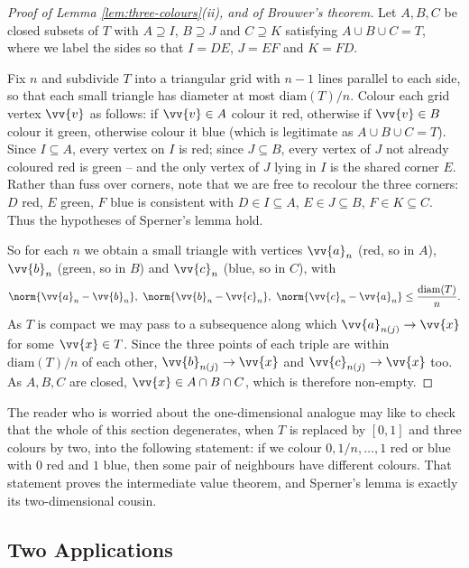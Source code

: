\begin{proof}[Proof of Lemma \ref{lem:three-colours}(ii), and of Brouwer's theorem]
	Let $A,B,C$ be closed subsets of $T$ with $A \supseteq I$, $B \supseteq J$ and $C \supseteq K$ satisfying $A \cup B \cup C = T$, where we label the sides so that $I = DE$, $J = EF$ and $K = FD$.

	Fix $n$ and subdivide $T$ into a triangular grid with $n-1$ lines parallel to each side, so that each small triangle has diameter at most $\mathrm{diam}(T)/n$. Colour each grid vertex $\vv{v}$ as follows: if $\vv{v} \in A$ colour it red, otherwise if $\vv{v}\in B$ colour it green, otherwise colour it blue (which is legitimate as $A\cup B\cup C = T$). Since $I \subseteq A$, every vertex on $I$ is red; since $J \subseteq B$, every vertex of $J$ not already coloured red is green -- and the only vertex of $J$ lying in $I$ is the shared corner $E$. Rather than fuss over corners, note that we are free to recolour the three corners: $D$ red, $E$ green, $F$ blue is consistent with $D \in I \subseteq A$, $E \in J \subseteq B$, $F \in K \subseteq C$. Thus the hypotheses of Sperner's lemma hold.

	So for each $n$ we obtain a small triangle with vertices $\vv{a}_n$ (red, so in $A$), $\vv{b}_n$ (green, so in $B$) and $\vv{c}_n$ (blue, so in $C$), with
	$$\norm{\vv{a}_n - \vv{b}_n},\ \norm{\vv{b}_n-\vv{c}_n},\ \norm{\vv{c}_n-\vv{a}_n} \leq \frac{\mathrm{diam}(T)}{n}.$$
	As $T$ is compact we may pass to a subsequence along which $\vv{a}_{n(j)} \to \vv{x}$ for some $\vv{x}\in T$. Since the three points of each triple are within $\mathrm{diam}(T)/n$ of each other, $\vv{b}_{n(j)} \to \vv{x}$ and $\vv{c}_{n(j)}\to\vv{x}$ too. As $A, B, C$ are closed, $\vv{x} \in A\cap B\cap C$, which is therefore non-empty.
\end{proof}

The reader who is worried about the one-dimensional analogue may like to check that the whole of this section degenerates, when $T$ is replaced by $[0,1]$ and three colours by two, into the following statement: if we colour $0,1/n,\ldots,1$ red or blue with $0$ red and $1$ blue, then some pair of neighbours have different colours. That statement proves the intermediate value theorem, and Sperner's lemma is exactly its two-dimensional cousin.

\subsection{Two Applications}

